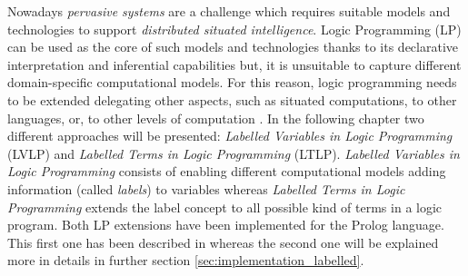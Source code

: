 Nowadays \textit{pervasive systems} are a challenge which requires suitable models and technologies to support
\textit{distributed situated intelligence}. Logic Programming (LP) can be used as the core of such models and technologies thanks to its declarative interpretation and inferential capabilities
but, it is unsuitable to capture different domain-specific computational models. For this reason, logic programming needs
to be extended delegating other aspects, such as situated computations, to other languages, or, to other levels of computation \cite{10.3233/FI-2018-1695}.\newline
In the following chapter two different approaches will be presented: \textit{Labelled Variables in Logic Programming} (LVLP) and
\textit{Labelled Terms in Logic Programming} (LTLP).\newline\newline
\textit{Labelled Variables in Logic Programming} consists of enabling different computational models adding information (called \textit{labels}) to variables
whereas \textit{Labelled Terms in Logic Programming} extends the label concept to all possible kind of terms in a logic program.\newline\newline
Both LP extensions have been implemented for the Prolog language. This first one has been described in \cite{10.3233/FI-2018-1695} whereas the second one will be explained more in details in further section \ref{sec:implementation_labelled}.